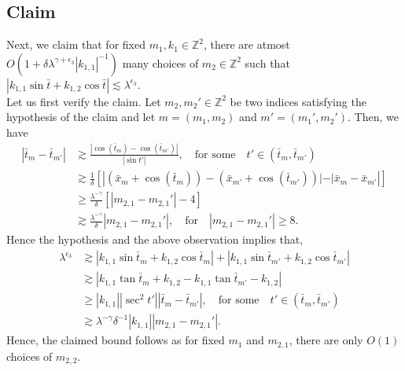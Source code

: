 \documentclass[a4paper,reqno]{amsart}
\theoremstyle{definition}
\theoremstyle{remark}
\numberwithin{equation}{section}
\newcommand{\Z}{{\mathbb Z}}
\begin{document}
	\subsection*{Claim}
	Next, we claim that for fixed $m_1,k_1\in\Z^2$, there are atmost $O(1+\delta\lambda^{\gamma+\epsilon_3}|k_{1,1}|^{-1})$ many choices of $m_2\in\Z^2$ such that $|k_{1,1}\sin\bar t+k_{1,2}\cos\bar t|\lesssim\lambda^{\epsilon_3}$.\\
	Let us first verify the claim. Let $m_2,m_2'\in\Z^2$ be two indices satisfying the hypothesis of the claim and let ${m}=(m_1,m_2)$ and ${m'}=(m_1',m_2')$. Then, we have
	\begin{align*}
		|\bar t_{{m}}-\bar t_{{m'}}|&\gtrsim\frac{|\cos(\bar t_{{m}})-\cos (\bar t_{{m'}})|}{|\sin t'|},\quad\text{for some}\quad t'\in(\bar t_{{m}},\bar t_{{m'}})\\
		&\gtrsim\frac{1}{\delta}\left[\left|\left(\bar x_{{m}}+\cos(\bar t_{{m}})\right)-\left(\bar x_{{m'}}+\cos (\bar t_{{m'}})\right)|-|\bar x_{{m}}-\bar x_{{m'}}\right|\right]\\
		&\geq \frac{\lambda^{-\gamma}}{\delta}\left[|m_{2,1}-m_{2,1}'|-4\right]\\
		&\gtrsim\frac{\lambda^{-\gamma}}{\delta}|m_{2,1}-m_{2,1}'|,\quad \text{for}\quad |m_{2,1}-m_{2,1}'|\geq 8.
	\end{align*}
	Hence the hypothesis and the above observation implies that,
	\begin{align*}
		\lambda^{\epsilon_3}&\gtrsim|k_{1,1}\sin\bar t_{{m}}+k_{1,2}\cos\bar  t_{{m}}|+|k_{1,1}\sin\bar t_{{m'}}+k_{1,2}\cos\bar t_{{m'}}|\\
		&\gtrsim|k_{1,1}\tan\bar t_{{m}}+k_{1,2}-k_{1,1}\tan\bar t_{{m'}}-k_{1,2}|\\
		&\geq|k_{1,1}||\sec^2 t'||\bar t_{{m}}-\bar t_{{m'}}|,\quad \text{for some}\quad t'\in(\bar t_{{m}},\bar t_{{m'}})\\
		&\gtrsim\lambda^{-\gamma}\delta^{-1}|k_{1,1}||m_{2,1}-m_{2,1}'|.
	\end{align*}
	Hence, the claimed bound follows as for fixed $m_1$ and $m_{2,1}$, there are only $O(1)$ choices of $m_{2,2}$.
	
\end{document}
